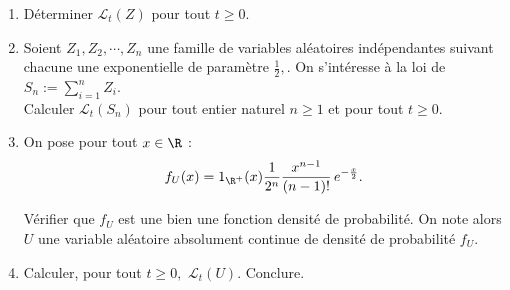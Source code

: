{\begin{enumerate}
\item D\'eterminer $\mathcal{L}_{t}(Z)$ pour tout $t\geq 0$. 
\item Soient $Z_1,Z_2,\cdots{},Z_n$ une famille de variables aléatoires indépendantes suivant chacune une exponentielle de param\`etre $\frac{1}{2},$. On s'int\'eresse \`a la loi de $S_n:=\displaystyle\sum_{i=1}^{n}Z_i$.\\

Calculer $\mathcal{L}_t(S_n)$ pour tout entier naturel $n\geq 1$ et pour tout $t\geq 0$.


\item On pose pour tout $x \in \R$ :
$$f_U(x)=\mathrm{1}_{\R^{+}}(x)\frac{1}{2^n}\frac{x^{n-1}}{(n-1)!}\,e^{-\frac{x}{2}}.$$

V\'erifier que $f_U$ est une bien une fonction densité de probabilité. On note alors $U$ une variable aléatoire absolument continue de densit\'e de probabilit\'e $f_U$.


\item Calculer, pour tout $t\geq 0,$ $\mathcal{L}_t(U)$. Conclure.

\end{enumerate} 

}